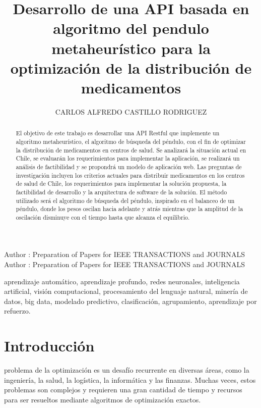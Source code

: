 \documentclass{ieeeaccess}
\begin{document}

\title{Desarrollo de una API basada en algoritmo del pendulo metaheurístico para la optimización de la distribución de medicamentos}
\author{\uppercase{Carlos Alfredo Castillo Rodriguez}}
\address[1]{Universidad Bernardo Ohiggins, Santiago de Chile, Chile, (e-mail: cacr1990@gmail.com)}
\tfootnote{}

\markboth
{Author \headeretal: Preparation of Papers for IEEE TRANSACTIONS and JOURNALS}
{Author \headeretal: Preparation of Papers for IEEE TRANSACTIONS and JOURNALS}


\begin{abstract}
El objetivo de este trabajo es desarrollar una API Restful que implemente un algoritmo metaheurístico, el algoritmo de búsqueda del péndulo, con el fin de optimizar la distribución de medicamentos en centros de salud. Se analizará la situación actual en Chile, se evaluarán los requerimientos para implementar la aplicación, se realizará un análisis de factibilidad y se propondrá un modelo de aplicación web. Las preguntas de investigación incluyen los criterios actuales para distribuir medicamentos en los centros de salud de Chile, los requerimientos para implementar la solución propuesta, la factibilidad de desarrollo y la arquitectura de software de la solución. El método utilizado será el algoritmo de búsqueda del péndulo, inspirado en el balanceo de un péndulo, donde los pesos oscilan hacia adelante y atrás mientras que la amplitud de la oscilación disminuye con el tiempo hasta que alcanza el equilibrio.
\end{abstract}

\begin{keywords}
aprendizaje automático, aprendizaje profundo, redes neuronales, inteligencia artificial, visión computacional, procesamiento del lenguaje natural, minería de datos, big data, modelado predictivo, clasificación, agrupamiento, aprendizaje por refuerzo.
\end{keywords}

\titlepgskip=-15pt

\maketitle

\section{Introducción}
\label{sec:introduction}
problema de la optimización es un desafío recurrente en diversas áreas, como la ingeniería, la salud, la logística, la informática y las finanzas. Muchas veces, estos problemas son complejos y requieren una gran cantidad de tiempo y recursos para ser resueltos mediante algoritmos de optimización exactos.
\end{document}
